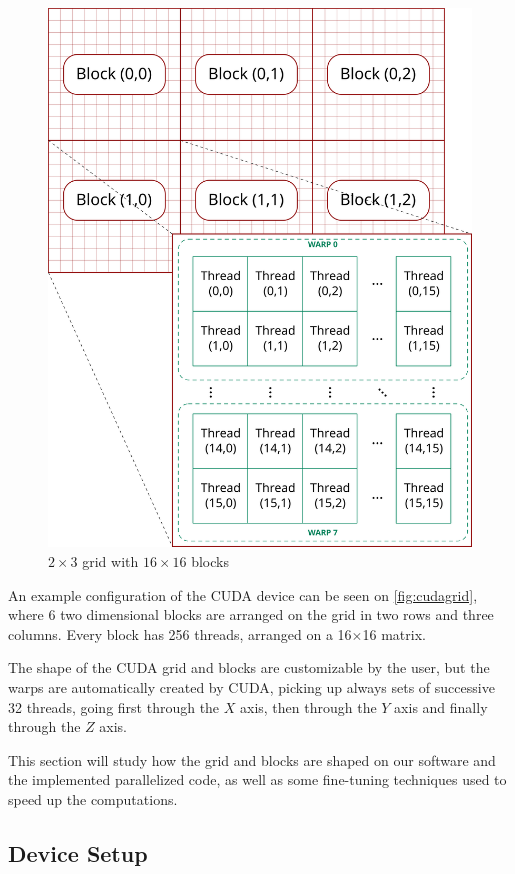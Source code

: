 \begin{figure}[bth]
	\myfloatalign
	\includegraphics[width=.8\linewidth]{gfx/cudagrid}
	\caption[$2\times3$ grid with $16\times16$ blocks]{$2\times3$ grid with $16\times16$ blocks}
	\label{fig:cudagrid}
\end{figure}

An example configuration of the \ac{CUDA} device can be seen on \autoref{fig:cudagrid}, where 6 two dimensional blocks are arranged on the grid in two rows and three columns. Every block has 256 threads, arranged on a 16$\times$16 matrix.

The shape of the \ac{CUDA} grid and blocks are customizable by the user, but the warps are automatically created by \ac{CUDA}, picking up always sets of successive 32 threads, going first through the $X$ axis, then through the $Y$ axis and finally through the $Z$ axis.

This section will study how the grid and blocks are shaped on our software and the implemented parallelized code, as well as some fine-tuning techniques used to speed up the computations.

\subsection{Device Setup}

